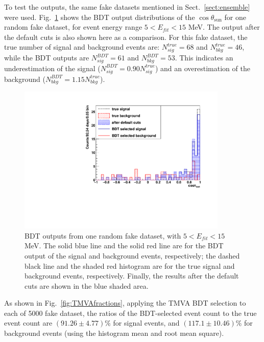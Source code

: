 To test the outputs, the same fake datasets mentioned in Sect.~\ref{sect:ensemble} were used. Fig.~\ref{fig:BDToutputs} shows the BDT output distributions of the $\cos\theta_\mathrm{sun}$ for one random fake dataset, for event energy range $5<E_{fit}<15$ MeV. The output after the default cuts is also shown here as a comparison. For this fake dataset, the true number of signal and background events are: $N^{true}_{sig}=68$ and $N^{true}_{bkg}=46$, while the BDT outputs are $N^{BDT}_{sig}=61$ and $N^{BDT}_{bkg}=53$. This indicates an underestimation of the signal ($N^{BDT}_{sig}=0.90 N^{true}_{sig}$) and an overestimation of the background ($N^{BDT}_{bkg}=1.15 N^{true}_{bkg}$). 

\begin{figure}[!htb]
	\centering
	\includegraphics[width=10cm]{tmvaHalfFakeData_output.pdf}
	\caption[BDT outputs from one random fake dataset ($5<E_{fit}<15$ MeV).]{BDT outputs from one random fake dataset, with $5<E_{fit}<15$ MeV. The solid blue line and the solid red line are for the BDT output of the signal and background events, respectively; the dashed black line and the shaded red histogram are for the true signal and background events, respectively. Finally, the results after the default cuts are shown in the blue shaded area.\label{fig:BDToutputs}}
\end{figure}

As shown in Fig.~\ref{fig:TMVAfractions}, applying the TMVA BDT selection to each of 5000 fake dataset, the ratios of the BDT-selected event count to the true event count are $(91.26\pm 4.77)\%$ for signal events, and $(117.1\pm 10.46)\%$ for background events (using the histogram mean and root mean square). 

